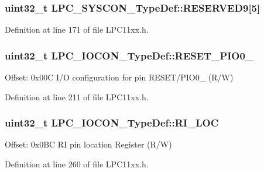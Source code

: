 \subsubsection[{\texorpdfstring{R\+E\+S\+E\+R\+V\+E\+D9}{RESERVED9}}]{\setlength{\rightskip}{0pt plus 5cm}uint32\+\_\+t L\+P\+C\+\_\+\+S\+Y\+S\+C\+O\+N\+\_\+\+Type\+Def\+::\+R\+E\+S\+E\+R\+V\+E\+D9\mbox{[}5\mbox{]}}\hypertarget{group___l_p_c11xx___definitions_ga92efb41fb5e7ec4f9840b6be6d86cbaa}{}\label{group___l_p_c11xx___definitions_ga92efb41fb5e7ec4f9840b6be6d86cbaa}


Definition at line 171 of file L\+P\+C11xx.\+h.

\subsubsection[{\texorpdfstring{R\+E\+S\+E\+T\+\_\+\+P\+I\+O0\+\_\+0}{RESET_PIO0_0}}]{ uint32\+\_\+t L\+P\+C\+\_\+\+I\+O\+C\+O\+N\+\_\+\+Type\+Def\+::\+R\+E\+S\+E\+T\+\_\+\+P\+I\+O0\+\_}\hypertarget{group___l_p_c11xx___definitions_gab69af896ceb6c10b8f9de41aa033da88}{}\label{group___l_p_c11xx___definitions_gab69af896ceb6c10b8f9de41aa033da88}
Offset\+: 0x00C I/O configuration for pin R\+E\+S\+E\+T/\+P\+I\+O0\+\_ (R/W) 

Definition at line 211 of file L\+P\+C11xx.\+h.

\subsubsection[{\texorpdfstring{R\+I\+\_\+\+L\+OC}{RI_LOC}}]{ uint32\+\_\+t L\+P\+C\+\_\+\+I\+O\+C\+O\+N\+\_\+\+Type\+Def\+::\+R\+I\+\_\+\+L\+OC}\hypertarget{group___l_p_c11xx___definitions_gac464399c1e24e3c34085b91429d0cebc}{}\label{group___l_p_c11xx___definitions_gac464399c1e24e3c34085b91429d0cebc}
Offset\+: 0x0\+BC RI pin location Register (R/W) 

Definition at line 260 of file L\+P\+C11xx.\+h.

